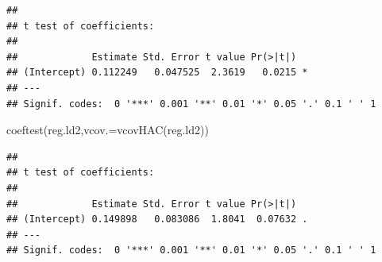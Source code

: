 \documentclass[
  12pt,
  oneside]{book}
\newenvironment{Shaded}{\begin{snugshade}}{\end{snugshade}}
\newcommand{\AttributeTok}[1]{\textcolor[rgb]{0.77,0.63,0.00}{#1}}
\newcommand{\DecValTok}[1]{\textcolor[rgb]{0.00,0.00,0.81}{#1}}
\newcommand{\FunctionTok}[1]{\textcolor[rgb]{0.00,0.00,0.00}{#1}}
\newcommand{\NormalTok}[1]{#1}
\newcommand{\OtherTok}[1]{\textcolor[rgb]{0.56,0.35,0.01}{#1}}
\newcommand{\SpecialCharTok}[1]{\textcolor[rgb]{0.00,0.00,0.00}{#1}}
\begin{document}
\begin{Shaded}
\end{Shaded}

\begin{verbatim}
## 
## t test of coefficients:
## 
##             Estimate Std. Error t value Pr(>|t|)  
## (Intercept) 0.112249   0.047525  2.3619   0.0215 *
## ---
## Signif. codes:  0 '***' 0.001 '**' 0.01 '*' 0.05 '.' 0.1 ' ' 1
\end{verbatim}

\begin{Shaded}
\begin{Highlighting}[]
\FunctionTok{coeftest}\NormalTok{(reg.ld2,}\AttributeTok{vcov.=}\FunctionTok{vcovHAC}\NormalTok{(reg.ld2))}
\end{Highlighting}
\end{Shaded}

\begin{verbatim}
## 
## t test of coefficients:
## 
##             Estimate Std. Error t value Pr(>|t|)  
## (Intercept) 0.149898   0.083086  1.8041  0.07632 .
## ---
## Signif. codes:  0 '***' 0.001 '**' 0.01 '*' 0.05 '.' 0.1 ' ' 1
\end{verbatim}
\end{document}
